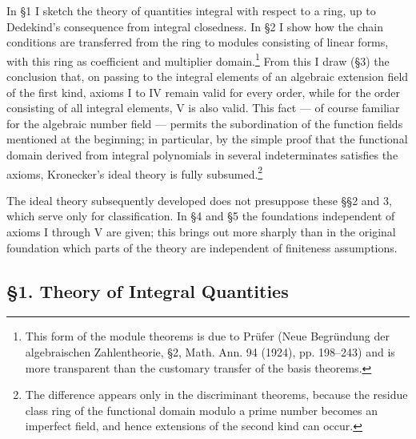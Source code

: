 \documentclass[11pt]{article}
\begin{document}
In §1 I sketch the theory of quantities integral with respect to a ring, up to
Dedekind's consequence from integral closedness. In §2 I show how the chain
conditions are transferred from the ring to modules consisting of linear forms, with
this ring as coefficient and multiplier domain.\footnote{This form of the module
theorems is due to Prüfer (Neue Begründung der algebraischen Zahlentheorie, §2,
Math. Ann. 94 (1924), pp. 198--243) and is more transparent than the customary
transfer of the basis theorems.} From this I draw (§3) the conclusion that, on
passing to the integral elements of an algebraic extension field of the first kind,
axioms I to IV remain valid for every order, while for the order consisting of all
integral elements, V is also valid. This fact — of course familiar for the algebraic
number field — permits the subordination of the function fields mentioned at the
beginning; in particular, by the simple proof that the functional domain derived from
integral polynomials in several indeterminates satisfies the axioms, Kronecker's
ideal theory is fully subsumed.\footnote{The difference appears only in the discriminant
theorems, because the residue class ring of the functional domain modulo a prime
number becomes an imperfect field, and hence extensions of the second kind can occur.}

The ideal theory subsequently developed does not presuppose these §§2 and 3, which
serve only for classification. In §4 and §5 the foundations independent of axioms I
through V are given; this brings out more sharply than in the original foundation
which parts of the theory are independent of finiteness assumptions.

\subsection*{§1. Theory of Integral Quantities}
\end{document}
